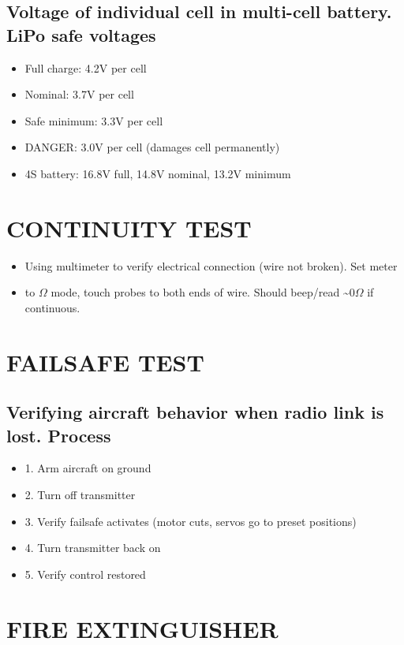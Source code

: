 \documentclass[11pt,letterpaper]{article}
\begin{document}
\subsection{Voltage of individual cell in multi-cell battery. LiPo safe voltages}

\begin{itemize}
  \item Full charge: 4.2V per cell
  \item Nominal: 3.7V per cell
  \item Safe minimum: 3.3V per cell
  \item DANGER: 3.0V per cell (damages cell permanently)
  \item 4S battery: 16.8V full, 14.8V nominal, 13.2V minimum
\end{itemize}

\section{CONTINUITY TEST}

\begin{itemize}
  \item Using multimeter to verify electrical connection (wire not broken). Set meter
  \item to $\Omega$ mode, touch probes to both ends of wire. Should beep/read \textasciitilde{}0$\Omega$ if continuous.
\end{itemize}

\section{FAILSAFE TEST}

\subsection{Verifying aircraft behavior when radio link is lost. Process}

\begin{itemize}
  \item 1. Arm aircraft on ground
  \item 2. Turn off transmitter
  \item 3. Verify failsafe activates (motor cuts, servos go to preset positions)
  \item 4. Turn transmitter back on
  \item 5. Verify control restored
\end{itemize}

\section{FIRE EXTINGUISHER}
\end{document}
